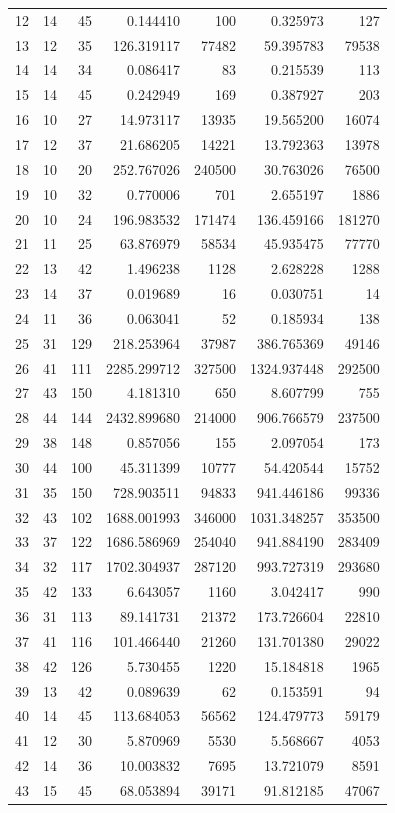 \documentclass{article}
\begin{document}
\begin{landscape}
\begin{longtable}{rrrrrrr}
12 & 14 & 45 & 0.144410 & 100 & 0.325973 & 127 \\
13 & 12 & 35 & 126.319117 & 77482 & 59.395783 & 79538 \\
14 & 14 & 34 & 0.086417 & 83 & 0.215539 & 113 \\
15 & 14 & 45 & 0.242949 & 169 & 0.387927 & 203 \\
16 & 10 & 27 & 14.973117 & 13935 & 19.565200 & 16074 \\
17 & 12 & 37 & 21.686205 & 14221 & 13.792363 & 13978 \\
18 & 10 & 20 & 252.767026 & 240500 & 30.763026 & 76500 \\
19 & 10 & 32 & 0.770006 & 701 & 2.655197 & 1886 \\
20 & 10 & 24 & 196.983532 & 171474 & 136.459166 & 181270 \\
21 & 11 & 25 & 63.876979 & 58534 & 45.935475 & 77770 \\
22 & 13 & 42 & 1.496238 & 1128 & 2.628228 & 1288 \\
23 & 14 & 37 & 0.019689 & 16 & 0.030751 & 14 \\
24 & 11 & 36 & 0.063041 & 52 & 0.185934 & 138 \\
25 & 31 & 129 & 218.253964 & 37987 & 386.765369 & 49146 \\
26 & 41 & 111 & 2285.299712 & 327500 & 1324.937448 & 292500 \\
27 & 43 & 150 & 4.181310 & 650 & 8.607799 & 755 \\
28 & 44 & 144 & 2432.899680 & 214000 & 906.766579 & 237500 \\
29 & 38 & 148 & 0.857056 & 155 & 2.097054 & 173 \\
30 & 44 & 100 & 45.311399 & 10777 & 54.420544 & 15752 \\
31 & 35 & 150 & 728.903511 & 94833 & 941.446186 & 99336 \\
32 & 43 & 102 & 1688.001993 & 346000 & 1031.348257 & 353500 \\
33 & 37 & 122 & 1686.586969 & 254040 & 941.884190 & 283409 \\
34 & 32 & 117 & 1702.304937 & 287120 & 993.727319 & 293680 \\
35 & 42 & 133 & 6.643057 & 1160 & 3.042417 & 990 \\
36 & 31 & 113 & 89.141731 & 21372 & 173.726604 & 22810 \\
37 & 41 & 116 & 101.466440 & 21260 & 131.701380 & 29022 \\
38 & 42 & 126 & 5.730455 & 1220 & 15.184818 & 1965 \\
39 & 13 & 42 & 0.089639 & 62 & 0.153591 & 94 \\
40 & 14 & 45 & 113.684053 & 56562 & 124.479773 & 59179 \\
41 & 12 & 30 & 5.870969 & 5530 & 5.568667 & 4053 \\
42 & 14 & 36 & 10.003832 & 7695 & 13.721079 & 8591 \\
43 & 15 & 45 & 68.053894 & 39171 & 91.812185 & 47067 \\
\end{longtable}


\end{landscape}
\end{document}

